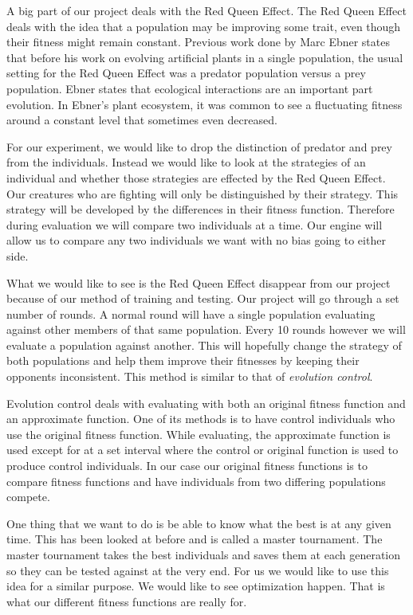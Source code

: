 \documentclass{acm_proc_article-sp}
\begin{document}
A big part of our project deals with the Red Queen Effect. The Red Queen Effect deals with the idea that a population may be improving some trait, even though their fitness might remain constant\cite{Ebner}. Previous work done by Marc Ebner\cite{Ebner} states that before his work on evolving artificial plants in a single population, the usual setting for the Red Queen Effect was a predator population versus a prey population\cite{Ebner}\cite{Red}. Ebner states that ecological interactions are an important part evolution. In Ebner's plant ecosystem, it was common to see a fluctuating fitness around a constant level that sometimes even decreased.

For our experiment, we would like to drop the distinction of predator and prey from the individuals. Instead we would like to look at the strategies of an individual and whether those strategies are effected by the Red Queen Effect. Our creatures who are fighting will only be distinguished by their strategy. This strategy will be developed by the differences in their fitness function. Therefore during evaluation we will compare two individuals at a time. Our engine will allow us to compare any two individuals we want with no bias going to either side.

What we would like to see is the Red Queen Effect disappear from our project because of our method of training and testing. Our project will go through a set number of rounds. A normal round will have a single population evaluating against other members of that same population. Every 10 rounds however we will evaluate a population against another. This will hopefully change the strategy of both populations and help them improve their fitnesses by keeping their opponents inconsistent. This method is similar to that of \textit{evolution control}\cite{Fitness}.

Evolution control deals with evaluating with both an original fitness function and an approximate function. One of its methods is to have control individuals who use the original fitness function. While evaluating, the approximate function is used except for at a set interval where the control or original function is used to produce control individuals. In our case our original fitness functions is to compare fitness functions and have individuals from two differing populations compete.

One thing that we want to do is be able to know what the best is at any given time. This has been looked at before and is called a master tournament\cite{Red}. The master tournament takes the best individuals and saves them at each generation so they can be tested against at the very end. For us we would like to use this idea for a similar purpose. We would like to see optimization happen. That is what our different fitness functions are really for.
\end{document}
